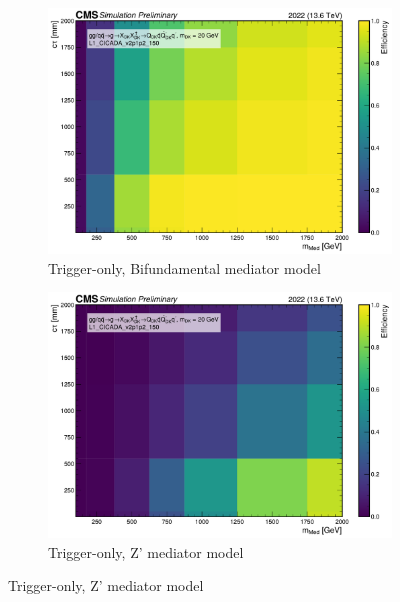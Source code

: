 \begin{figure}[h]
  \centering

  \begin{subfigure}[t]{0.45\textwidth}
    \centering
    \includegraphics[width=\linewidth]{images/L1/ad_2D_tchan/trigeffplots2D_L1_efftype-trig_t-channel_mDark-20_L1_CICADA_v2p1p2_150_study_cloppear.pdf}
    \caption{Trigger-only, Bifundamental mediator model}
    \label{fig:cicada_trig_tchan}
  \end{subfigure}
  \hfill
  \begin{subfigure}[t]{0.45\textwidth}
    \centering
    \includegraphics[width=\linewidth]{images/L1/ad_2D_schan/trigeffplots2D_L1_efftype-trig_s-channel_mDark-20_L1_CICADA_v2p1p2_150_study_cloppear.pdf}
    \caption{Trigger-only, Z' mediator model}
    \label{fig:cicada_trig_schan}
  \end{subfigure}


\end{figure}

